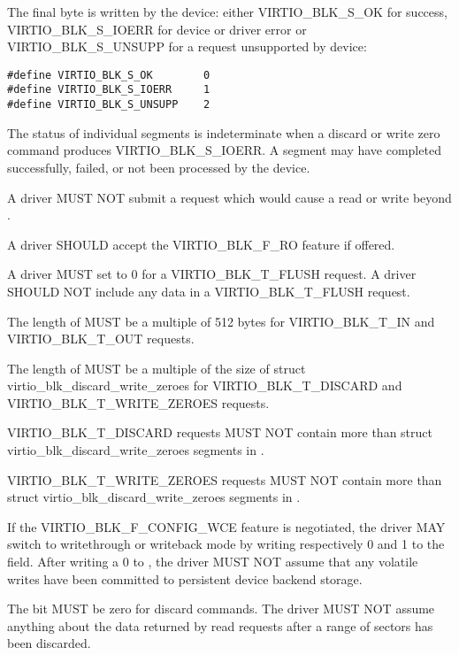 The final  byte is written by the device: either
VIRTIO_BLK_S_OK for success, VIRTIO_BLK_S_IOERR for device or driver
error or VIRTIO_BLK_S_UNSUPP for a request unsupported by device:

\begin{lstlisting}
#define VIRTIO_BLK_S_OK        0
#define VIRTIO_BLK_S_IOERR     1
#define VIRTIO_BLK_S_UNSUPP    2
\end{lstlisting}

The status of individual segments is indeterminate when a discard or write zero
command produces VIRTIO_BLK_S_IOERR.  A segment may have completed
successfully, failed, or not been processed by the device.


A driver MUST NOT submit a request which would cause a read or write
beyond .

A driver SHOULD accept the VIRTIO_BLK_F_RO feature if offered.

A driver MUST set  to 0 for a VIRTIO_BLK_T_FLUSH request.
A driver SHOULD NOT include any data in a VIRTIO_BLK_T_FLUSH request.

The length of  MUST be a multiple of 512 bytes for VIRTIO_BLK_T_IN
and VIRTIO_BLK_T_OUT requests.

The length of  MUST be a multiple of the size of struct
virtio_blk_discard_write_zeroes for VIRTIO_BLK_T_DISCARD and
VIRTIO_BLK_T_WRITE_ZEROES requests.

VIRTIO_BLK_T_DISCARD requests MUST NOT contain more than
 struct virtio_blk_discard_write_zeroes segments in
.

VIRTIO_BLK_T_WRITE_ZEROES requests MUST NOT contain more than
 struct virtio_blk_discard_write_zeroes segments in
.

If the VIRTIO_BLK_F_CONFIG_WCE feature is negotiated, the driver MAY
switch to writethrough or writeback mode by writing respectively 0 and
1 to the  field.  After writing a 0 to ,
the driver MUST NOT assume that any volatile writes have been committed
to persistent device backend storage.

The  bit MUST be zero for discard commands.  The driver
MUST NOT assume anything about the data returned by read requests after
a range of sectors has been discarded.

